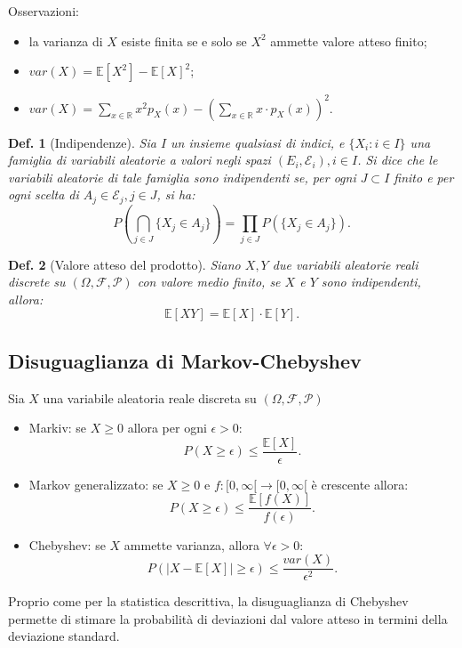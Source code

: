 \documentclass{article}
\newtheorem{definition}{Def.}[section]
\begin{document}
Osservazioni:
\begin{itemize}
	\item la varianza di $X$ esiste finita se e solo se $X^2$ ammette valore
		atteso finito;

	\item $var(X) = \mathbb{E}[X^2] - \mathbb{E}[X]^2$;
	
	\item $var(X) = \sum_{x \in \mathbb{R}} x^2 p_X(x) - (\sum_{x \in
		\mathbb{R}} x \cdot p_X(x))^2$.
\end{itemize}

\begin{definition}[Indipendenze]
	Sia $I$ un insieme qualsiasi di indici, e $\{X_i : i \in I\}$ una famiglia 
	di variabili aleatorie a valori negli spazi $(E_i,\mathcal{E}_i), i \in I$. 
	Si dice che le variabili aleatorie di tale famiglia sono indipendenti se,
	per ogni $J \subset I$ finito e per ogni scelta di $A_j \in \mathcal{E}_j,
	j\in J$, si ha:
	\begin{equation}
		P(\bigcap_{j \in J}\{X_j \in A_j\}) = \prod_{j \in J}P(\{X_j \in A_j\}).
	\end{equation}
\end{definition}

\begin{definition}[Valore atteso del prodotto]
	Siano $X, Y$ due variabili aleatorie reali discrete su $(\Omega, \mathcal{F, P})$
	con valore medio finito, se $X$ e $Y$ sono indipendenti, allora:
	\begin{equation}
		\mathbb{E}[XY] = \mathbb{E}[X] \cdot \mathbb{E}[Y].
	\end{equation}
\end{definition}

\subsection{Disuguaglianza di Markov-Chebyshev}
Sia $X$ una variabile aleatoria reale discreta su $(\Omega, \mathcal{F, P})$
\begin{itemize}
	\item Markiv: se $X \geq 0$ allora per ogni $\epsilon > 0$:
		\begin{equation}
			P(X \geq \epsilon) \leq \frac{\mathbb{E}[X]}{\epsilon}.
		\end{equation}

	\item Markov generalizzato: se $X \geq 0$ e $f:[0,\infty[ \to [0,\infty[$
		è crescente allora:
		\begin{equation}
			P(X \geq \epsilon) \leq \frac{\mathbb{E}[f(X)]}{f(\epsilon)}.
		\end{equation}

	\item Chebyshev: se $X$ ammette varianza, allora $\forall \epsilon > 0$:
		\begin{equation}
			P(|X - \mathbb{E}[X]| \geq \epsilon) \leq \frac{var(X)}{\epsilon^2}.
		\end{equation}
\end{itemize}
Proprio come per la statistica descrittiva, la disuguaglianza di Chebyshev
permette di stimare la probabilità di deviazioni dal valore atteso in termini
della deviazione standard.
\end{document}
